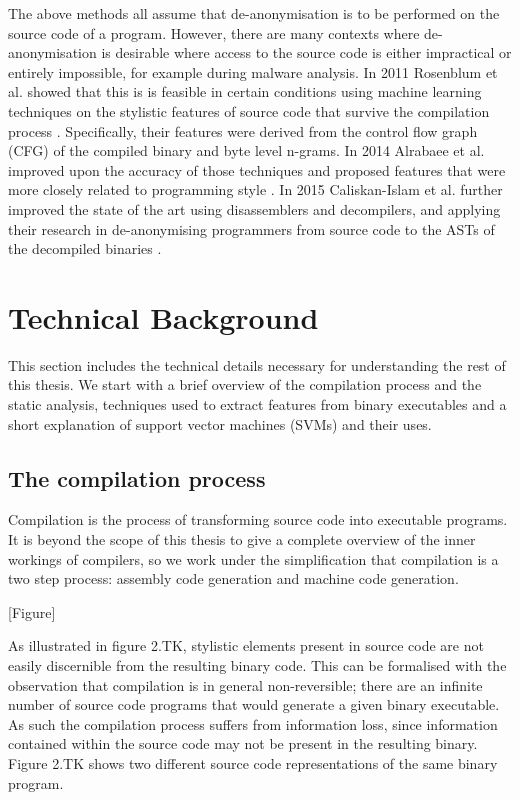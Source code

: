 \documentclass[a4paper,11pt]{kth-mag}
\begin{document}
The above methods all assume that de-anonymisation is to be performed on the
source code of a program. However, there are many contexts where
de-anonymisation is desirable where access to the source code is either
impractical or entirely impossible, for example during malware analysis. In
2011 Rosenblum et al. showed that this is is feasible in certain conditions
using machine learning techniques on the stylistic features of source code that
survive the compilation process \parencite{rosenblum2011wrote}. Specifically,
their features were derived from the control flow graph (CFG) of the compiled
binary and byte level n-grams. In 2014 Alrabaee et al. improved upon the
accuracy of those techniques and proposed features that were more closely
related to programming style \parencite{alrabaee2014oba2}. In 2015
Caliskan-Islam et al. further improved the state of the art using disassemblers
and decompilers, and applying their research in de-anonymising programmers from
source code to the ASTs of the decompiled binaries
\parencite{caliskan2015coding}.

\section{Technical Background}
This section includes the technical details necessary for understanding the
rest of this thesis. We start with a brief overview of the compilation process
and the static analysis, techniques used to extract features from binary
executables and a short explanation of support vector machines (SVMs) and their
uses. 

\subsection{The compilation process}
Compilation is the process of transforming source code into executable
programs. It is beyond the scope of this thesis to give a complete overview of
the inner workings of compilers, so we work under the simplification that
compilation is a two step process: assembly code generation and machine code
generation.

[Figure]

As illustrated in figure 2.TK, stylistic elements present in source code are
not easily discernible from the resulting binary code. This can be formalised
with the observation that compilation is in general non-reversible; there are
an infinite number of source code programs that would generate a given binary
executable. As such the compilation process suffers from information loss,
since information contained within the source code may not be present in the
resulting binary. Figure 2.TK shows two different source code representations
of the same binary program.
\end{document}
